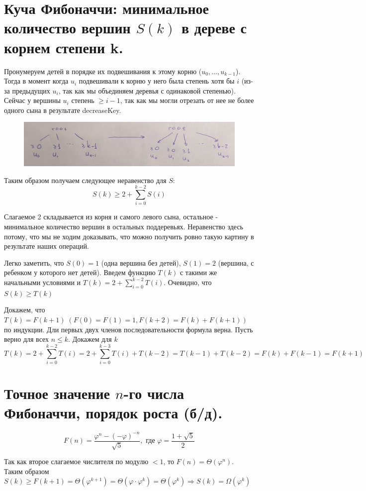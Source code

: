 \section{Куча Фибоначчи: минимальное количество вершин $S(k)$ в дереве с корнем степени k.}
\par Пронумеруем детей в порядке их подвешивания к этому корню ($u_0, \ldots, u_{k-1}$). Тогда в момент когда $u_i$ подвешивали к корню у него была степень хотя бы $i$ (из-за предыдущих $u_i$, так как мы объединяем деревья с одинаковой степенью). Сейчас у вершины $u_i$ степень $\geqslant i-1$, так как мы могли отрезать от нее не более одного сына в результате decreaseKey.
\begin{figure}[h]
    \centering
    \includegraphics[width=\linewidth]{images/38}
\end{figure}
\par Таким образом получаем следующее неравенство для $S$: 
$$S(k) \geqslant 2 + \sum\limits_{i=0}^{k-2} S(i)$$
\par Слагаемое 2 складывается из корня и самого левого сына, остальное - минимальное количество вершин в остальных поддеревьях. Неравенство здесь потому, что мы не ходим доказывать, что можно получить ровно такую картину в результате наших операций.
\par Легко заметить, что $S(0)=1$ (одна вершина без детей), $S(1)=2$ (вершина, с ребенком у которого нет детей). Введем функцию $T(k)$ с такими же начальными условиями и $T(k)=2+\sum\limits_{i=0}^{k-2} T(i)$. Очевидно, что $S(k) \geqslant T(k)$
\par Докажем, что $T(k)=F(k+1) \; (F(0)=F(1)=1, F(k+2)=F(k)+F(k+1))$ по индукции. Дли первых двух членов последовательности формула верна. Пусть верно для всех $n \leqslant k$. Докажем для $k$
$$T(k)=2+\sum\limits_{i=0}^{k-2} T(i)=2+\sum\limits_{i=0}^{k-3} T(i) + T(k-2)=T(k-1)+T(k-2)=F(k)+F(k-1)=F(k+1)$$

\setcounter{section}{38}
\section{Точное значение $n$-го числа Фибоначчи, порядок роста (б/д).}
$$F(n)=\frac{\varphi^n-(-\varphi)^{-n}}{\sqrt{5}}, \text{ где } \varphi=\frac{1+\sqrt{5}}{2}$$
\par Так как второе слагаемое числителя по модулю $<1$, то $F(n)=\Theta(\varphi^n)$. Таким образом $S(k) \geqslant F(k+1)=\Theta(\varphi^{k+1})=\Theta(\varphi \cdot \varphi^{k})=\Theta(\varphi^{k}) \Rightarrow S(k)=\Omega(\varphi^k)$